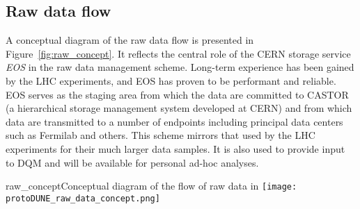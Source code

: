 \subsection{Raw data flow}
\label{sec:raw_concept}


A conceptual diagram of the raw data flow is presented in
Figure~\ref{fig:raw_concept}.  It reflects the central role of the
CERN storage service \textit{EOS} in the raw data management scheme.
Long-term experience has been gained by the LHC experiments, and EOS
has proven to be performant and reliable.  EOS serves as the staging
area from which the data are committed to CASTOR (a hierarchical
storage management system developed at CERN) and from which data are
transmitted to a number of endpoints including principal data centers
such as Fermilab and others.  This scheme mirrors that used by the LHC experiments for their much larger data samples. It is also used to provide input to DQM
and will be available for personal ad-hoc analyses.

\begin{cdrfigure}{raw_concept}{Conceptual diagram of the flow of raw data in \pdsp} 
\texttt{[image: protoDUNE\_raw\_data\_concept.png]}
\end{cdrfigure}


